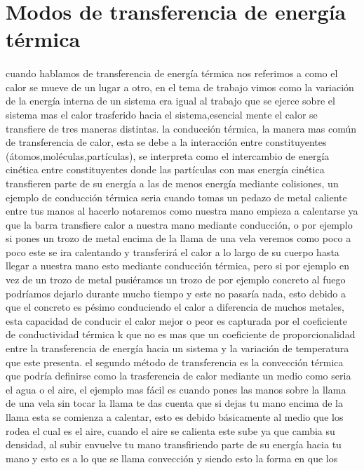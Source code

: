 \documentclass{article}
\begin{document}
\section*{Modos de transferencia de energía térmica}
\paragraph*{}
cuando hablamos de transferencia de energía térmica nos referimos a como el calor se mueve
de un lugar a otro, en el tema de trabajo vimos como la variación de la energía interna de un
sistema era igual al trabajo que se ejerce sobre el sistema mas el calor trasferido hacia el 
sistema,esencial mente el calor se transfiere de tres maneras distintas.
la conducción térmica, la manera mas común de transferencia de calor, esta se debe a la interacción 
entre constituyentes (átomos,moléculas,partículas), se interpreta como el intercambio de energía cinética
entre constituyentes donde las partículas con mas energía cinética transfieren parte de su energía a las
de menos energía mediante colisiones, un ejemplo de conducción térmica seria cuando tomas un pedazo de metal
caliente entre tus manos al hacerlo notaremos como nuestra mano empieza a calentarse ya que la barra transfiere
calor a nuestra mano mediante conducción, o por ejemplo si pones un trozo de metal encima de la llama de una vela
veremos como poco a poco este se ira calentando y transferirá el calor a lo largo de su cuerpo hasta llegar a nuestra
mano esto mediante conducción térmica, pero si por ejemplo en vez de un trozo de metal pusiéramos un trozo de por ejemplo
concreto al fuego podríamos dejarlo durante mucho tiempo y este no pasaría nada, esto debido a que el concreto es pésimo 
conduciendo el calor a diferencia de muchos metales, esta capacidad de conducir el calor mejor o peor es capturada
por el coeficiente de conductividad térmica k que no es mas que un coeficiente de proporcionalidad entre la transferencia
de energía hacia un sistema y la variación de temperatura que este presenta.
el segundo método de transferencia es la convección térmica que podría definirse como la trasferencia de calor mediante
un medio como seria el agua o el aire, el ejemplo mas fácil es cuando pones las manos sobre la llama de una vela sin tocar 
la llama te das cuenta que si dejas tu mano encima de la llama esta se comienza a calentar, esto es debido básicamente al medio
que los rodea el cual es el aire, cuando el aire se calienta este sube ya que cambia su densidad, al subir envuelve tu mano
transfiriendo parte de su energía hacia tu mano y esto es a lo que se llama convección y siendo esto la forma en que los
\end{document}
